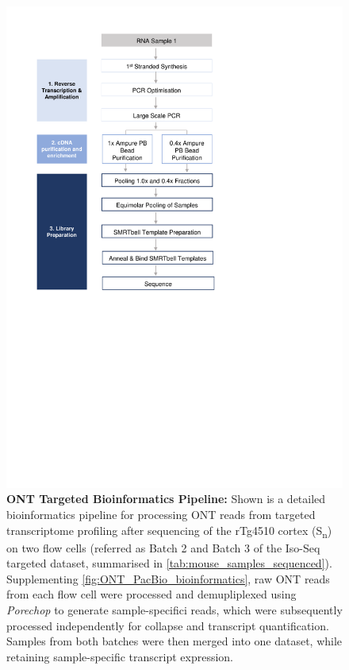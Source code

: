 \begin{figure}[htp]
	\centering
	\includegraphics[page=16,trim={0cm 8cm 0cm 0cm},clip,scale = 0.8]{Figures/ProjectDevelopment_Figures}
	\captionsetup{width=0.95\textwidth,singlelinecheck=off}
	\caption[ONT Targeted Bioinformatics Pipeline]%
	{\textbf{ONT Targeted Bioinformatics Pipeline:} Shown is a detailed bioinformatics pipeline for processing ONT reads from targeted transcriptome profiling after sequencing of the rTg4510 cortex (S\textsubscript{n}) on two flow cells (referred as Batch 2 and Batch 3 of the Iso-Seq targeted dataset, summarised in \cref{tab:mouse_samples_sequenced}). Supplementing \cref{fig:ONT_PacBio_bioinformatics}, raw ONT reads from each flow cell were processed and demupliplexed using \textit{Porechop} to generate sample-specifici reads, which were subsequently processed independently for collapse and transcript quantification. Samples from both batches were then merged into one dataset, while retaining sample-specific transcript expression. 
	}
	\label{fig:ONT_Targeted_bioinformatics}
\end{figure}

